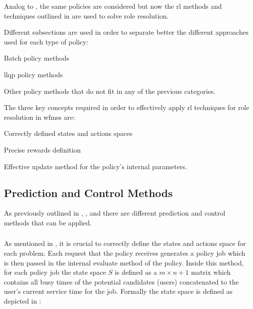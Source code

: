 Analog to , the same policies are considered but now the \gls{rl} methods and techniques outlined in  are used to solve role resolution.

Different subsections are used in order to separate better the different approaches used for each type of policy:
\begin{enumerate*}
	\item Batch policy methods
	\item \gls{llqp} policy methods
	\item Other policy methods that do not fit in any of the previous categories.
\end{enumerate*}

The three key concepts required in order to effectively apply \gls{rl} techniques for role resolution in \glspl{wfms} are:
\begin{enumerate*}
	\item Correctly defined states and actions spaces
	\item Precise rewards definition
	\item Effective update method for the policy's internal parameters. 
\end{enumerate*}

\subsection{Prediction and Control Methods}

As previously outlined in , ,  and  there are different prediction and control methods that can be applied.

\subsubsection{}

As mentioned in , it is crucial to correctly define the states and actions space for each problem. Each request that the policy receives generates a policy job which is then passed in the internal evaluate method of the policy. Inside this method, for each policy job the state space $S$ is defined as a $m \times n+1$ matrix which contains all busy times of the potential candidates (\ie users) concatenated to the user's current service time for the job. Formally the state space is defined as depicted in :

